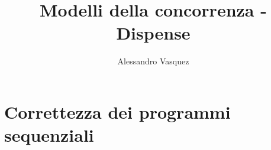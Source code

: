 \documentclass[11pt,a4paper]{report}
\author{Alessandro Vasquez}
\title{Modelli della concorrenza - Dispense}
\begin{document}
	\maketitle
	\newpage
	\tableofcontents
	\newpage
	
	\part{Correttezza dei programmi sequenziali}
	
\end{document}
